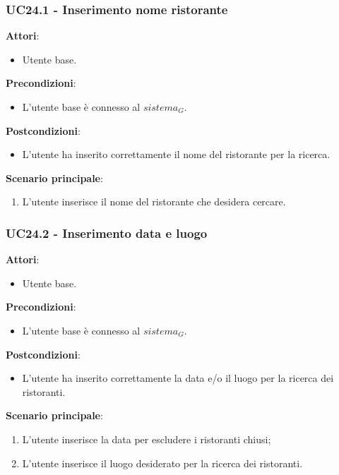 \subsubsection{UC24.1 - Inserimento nome ristorante
}\label{usecase:24_1}
\textbf{Attori}:
\begin{itemize}
    \item Utente base.
\end{itemize}
\textbf{Precondizioni}:
\begin{itemize}
    \item L'utente base è connesso al $\textit{sistema}_G$.
\end{itemize}
\textbf{Postcondizioni}:
\begin{itemize}
    \item L'utente ha inserito correttamente il nome del ristorante per la ricerca.
\end{itemize}
\textbf{Scenario principale}:
\begin{enumerate}
    \item L'utente inserisce il nome del ristorante che desidera cercare.
\end{enumerate}

\subsubsection{UC24.2 - Inserimento data e luogo
}\label{usecase:24_2}
\textbf{Attori}:
\begin{itemize}
    \item Utente base.
\end{itemize}
\textbf{Precondizioni}:
\begin{itemize}
    \item L'utente base è connesso al $\textit{sistema}_G$.
\end{itemize}
\textbf{Postcondizioni}:
\begin{itemize}
    \item L'utente ha inserito correttamente la data e/o il luogo per la ricerca dei ristoranti.
\end{itemize}
\textbf{Scenario principale}:
\begin{enumerate}
    \item L'utente inserisce la data per escludere i ristoranti chiusi;
    \item L'utente inserisce il luogo desiderato per la ricerca dei ristoranti.
\end{enumerate}


